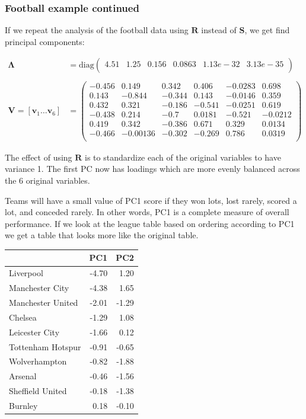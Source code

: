 \documentclass[
]{book}
\theoremstyle{definition}
\theoremstyle{definition}
\theoremstyle{definition}
\theoremstyle{definition}
\theoremstyle{remark}
\begin{document}
\subsubsection{Football example continued}\label{football-example-continued}

If we repeat the analysis of the football data using \(\mathbf R\) instead of \(\mathbf S\), we get find principal components:

\begin{align*}
\boldsymbol \Lambda&= \text{diag}\begin{pmatrix}4.51&1.25&0.156&0.0863&1.13e-32&3.13e-35 \\\end{pmatrix}\\
\;\\
\mathbf V= [\mathbf v_1 \ldots \mathbf v_6] &=\begin{pmatrix}-0.456&0.149&0.342&0.406&-0.0283&0.698 \\0.143&-0.844&-0.344&0.143&-0.0146&0.359 \\0.432&0.321&-0.186&-0.541&-0.0251&0.619 \\-0.438&0.214&-0.7&0.0181&-0.521&-0.0212 \\0.419&0.342&-0.386&0.671&0.329&0.0134 \\-0.466&-0.00136&-0.302&-0.269&0.786&0.0319 \\\end{pmatrix}
\end{align*}

The effect of using \(\mathbf R\) is to standardize each of the original variables to have variance 1.
The first PC now has loadings which are more evenly balanced across the 6 original variables.

Teams will have a small value of PC1 score if they won lots, lost rarely, scored a lot, and conceded rarely. In other words, PC1 is a complete measure of overall performance. If we look at the league table based on ordering according to PC1 we get a table that looks more like the original table.

\begin{tabular}{lrr}
\toprule
  & PC1 & PC2\\
\midrule
Liverpool & -4.70 & 1.20\\
Manchester City & -4.38 & 1.65\\
Manchester United & -2.01 & -1.29\\
Chelsea & -1.29 & 1.08\\
Leicester City & -1.66 & 0.12\\
\addlinespace
Tottenham Hotspur & -0.91 & -0.65\\
Wolverhampton & -0.82 & -1.88\\
Arsenal & -0.46 & -1.56\\
Sheffield United & -0.18 & -1.38\\
Burnley & 0.18 & -0.10\\
\bottomrule
\end{tabular}
\end{document}
